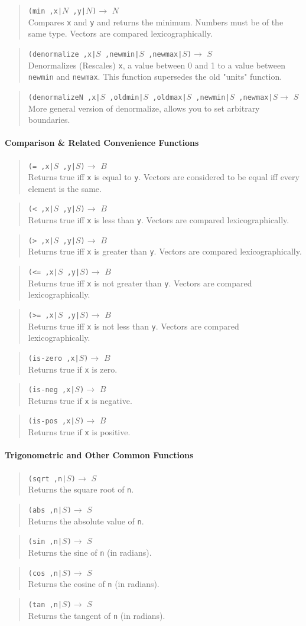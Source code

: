 \documentclass{article}
\newcommand\function[3]
{\begin{quote}{\tt #1}$\rightarrow$ \type{#2} \\ #3 \end{quote}}
\newcommand\type[1]{$#1$}
\newcommand\var[1]{{\tt #1}}
\begin{document}
\function{(min ,x|\type{N} ,y|\type{N})}{N}{Compares 
  \var{x} and \var{y} and returns the minimum.  Numbers must be of
  the same type.  Vectors are compared lexicographically.}

\function{(denormalize ,x|\type{S} ,newmin|\type{S} ,newmax|\type{S})}{S}
{Denormalizes (Rescales) \var{x}, a value between 0 and 1 to a value between 
\var{newmin} and \var{newmax}. This function supersedes the old "units" function.}

\function{(denormalizeN ,x|\type{S} ,oldmin|\type{S} ,oldmax|\type{S} ,newmin|\type{S} ,newmax|\type{S}}{S}
{More general version of denormalize, allows you to set arbitrary boundaries.}

\paragraph{Comparison \& Related Convenience Functions}
\function{(= ,x|\type{S} ,y|\type{S})}{B}{Returns true iff \var{x} is
  equal to \var{y}. Vectors are considered to be equal iff every element is the same.}

\function{(< ,x|\type{S} ,y|\type{S})}{B}{Returns true iff \var{x} is
  less than \var{y}. Vectors are compared lexicographically.}

\function{(> ,x|\type{S} ,y|\type{S})}{B}{Returns true iff \var{x} is
  greater than \var{y}. Vectors are compared lexicographically.}

\function{(<= ,x|\type{S} ,y|\type{S})}{B}{Returns true iff \var{x} is
  not greater than \var{y}. Vectors are compared lexicographically.}

\function{(>= ,x|\type{S} ,y|\type{S})}{B}{Returns true iff \var{x} is
  not less than \var{y}. Vectors are compared lexicographically.}

\function{(is-zero ,x|\type{S})}{B}{Returns true if \var{x} is zero.}
\function{(is-neg ,x|\type{S})}{B}{Returns true if \var{x} is negative.}
\function{(is-pos ,x|\type{S})}{B}{Returns true if \var{x} is positive.}


\paragraph{Trigonometric and Other Common Functions}

\function{(sqrt ,n|\type{S})}{S}{Returns the square root of \var{n}.}
\function{(abs ,n|\type{S})}{S}{Returns the absolute value of \var{n}.}
\function{(sin ,n|\type{S})}{S}{Returns the sine of \var{n} (in radians).}
\function{(cos ,n|\type{S})}{S}{Returns the cosine of \var{n} (in radians).}
\function{(tan ,n|\type{S})}{S}{Returns the tangent of \var{n} (in radians).}
\end{document}
